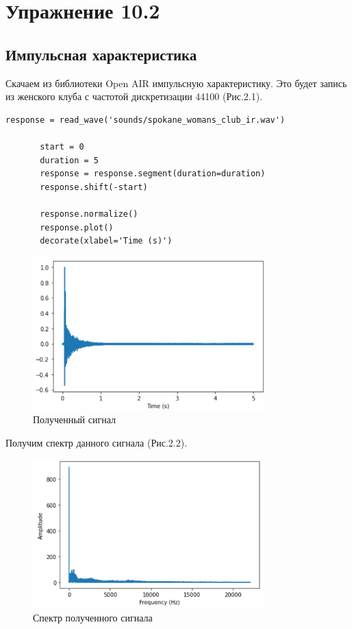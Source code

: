\documentclass[a4paper,12pt]{report}
\begin{document}
\chapter{Упражнение 10.2}
\section{Импульсная характеристика}
    Скачаем из библиотеки Open AIR импульсную характеристику. Это будет запись из женского клуба с частотой дискретизации 44100 (Рис.2.1). 
\begin{lstlisting}[caption=Получение сигнала]
       response = read_wave('sounds/spokane_womans_club_ir.wav')

       start = 0
       duration = 5
       response = response.segment(duration=duration)
       response.shift(-start)

       response.normalize()
       response.plot()
       decorate(xlabel='Time (s)')
\end{lstlisting}
\begin{figure}[H]
        \centering
        \includegraphics[width=0.8\textwidth]{fig2-1.PNG}
        \caption{Полученный сигнал}
        \label{fig:fig2-1}
\end{figure}  
    
    Получим спектр данного сигнала (Рис.2.2). 
\begin{figure}[H]
        \centering
        \includegraphics[width=0.8\textwidth]{fig2-2.PNG}
        \caption{Спектр полученного сигнала}
        \label{fig:fig2-2}
\end{figure}   
    
\end{document}
